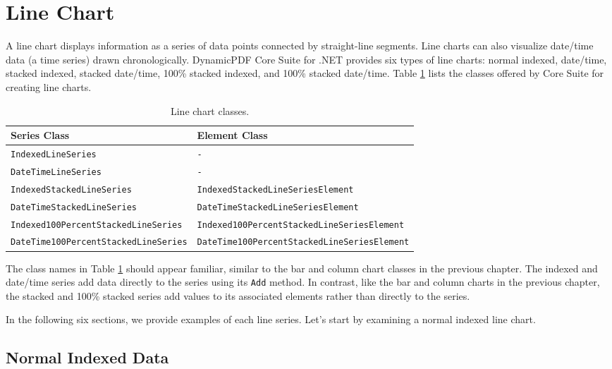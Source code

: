 \documentclass[american,letterpaper]{tufte-book}
\providecommand{\tabularnewline}{\\}
\numberwithin{equation}{section}
\numberwithin{figure}{section}
\begin{document}
{\section{Line Chart}\label{sec:Line-Chart}

A line chart displays information as a series of data points connected
by straight-line segments. Line charts can also visualize date/time
data (a time series) drawn chronologically. DynamicPDF Core Suite
for .NET provides six types of line charts: normal indexed, date/time,
stacked indexed, stacked date/time, 100\% stacked indexed, and 100\%
stacked date/time. Table \ref{tab:line-chart-Core-Suite-classes-1-1}
lists the classes offered by Core Suite for creating line charts.

\begin{table}
\raggedright
\begin{tabular}{p{}p{}}
\toprule 
{\scriptsize Series Class} & {\scriptsize Element Class}\tabularnewline
\midrule
{\scriptsize\texttt{IndexedLineSeries}} & {\scriptsize\texttt{-}}\tabularnewline
{\scriptsize\texttt{DateTimeLineSeries}} & {\scriptsize\texttt{-}}\tabularnewline
{\scriptsize\texttt{IndexedStackedLineSeries}} & {\scriptsize\texttt{IndexedStackedLineSeriesElement}}\tabularnewline
{\scriptsize\texttt{DateTimeStackedLineSeries}} & {\scriptsize\texttt{DateTimeStackedLineSeriesElement}}\tabularnewline
{\scriptsize\texttt{Indexed100PercentStackedLineSeries}} & {\scriptsize\texttt{Indexed100PercentStackedLineSeriesElement}}\tabularnewline
{\scriptsize\texttt{DateTime100PercentStackedLineSeries}} & {\scriptsize\texttt{DateTime100PercentStackedLineSeriesElement}}\tabularnewline
\bottomrule
\end{tabular}\caption{Line chart classes.}\label{tab:line-chart-Core-Suite-classes-1-1}
\end{table}
\medskip{}
The class names in Table \ref{tab:line-chart-Core-Suite-classes-1-1}
should appear familiar, similar to the bar and column chart classes
in the previous chapter. The indexed and date/time series add data
directly to the series using its \texttt{Add} method. In contrast,
like the bar and column charts in the previous chapter, the stacked
and 100\% stacked series add values to its associated elements rather
than directly to the series. 

In the following six sections, we provide examples of each line series.
Let's start by examining a normal indexed line chart.

\subsection{Normal Indexed Data}

}
\end{document}
